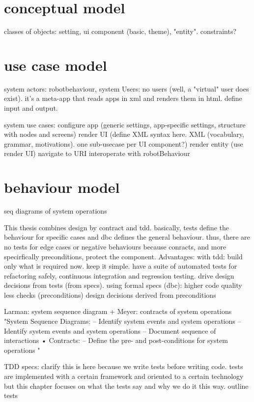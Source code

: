 \section{conceptual model}

classes of objects: setting, ui component (basic, theme), "entity". 
constraints?

\section{use case model}
system actors:
robotbehaviour, system
Users: no users (well, a "virtual" user does exist). it's a meta-app that reads apps in xml and renders them in html. define input and output.


system use cases:
configure app (generic settings, app-specific settings, structure with nodes and screens)
render UI (define XML syntax here. XML (vocabulary, grammar, motivations). one sub-usecase per UI component?)
render entity (use render UI)
navigate to URI
interoperate with robotBehaviour 

\section{behaviour model}
seq diagrams of system operations

This thesis combines design by contract and tdd. basically, tests define the behaviour for specific cases and dbc defines the general behaviour. thus, there are no tests for edge cases or negative behaviours because conracts, and more specirfically preconditions, protect the component.
Advantages:
with tdd:
build only what is required now. keep it simple.
have a suite of automated tests for refactoring safely, continuous integration and regression testing.
drive design decisions from tests (from specs).
using formal specs (dbc):
higher code quality
less checks (preconditions)
design decisions derived from preconditions

Larman: system sequence diagram + Meyer: contracts of system operations
"System Sequence Diagrams:
–
Identify system events and system operations
–
Identify system events and system operations
– Document sequence of interactions
• Contracts:
– Define the pre- and post-conditions for system
operations "


TDD specs:
clarify this is here because we write tests before writing code. tests are implemented with a certain framework and oriented to a certain technology but this chapter focuses on what the tests say and why we do it this way.
outline tests


